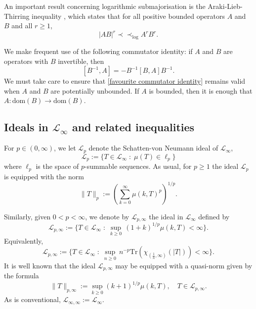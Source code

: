     An important result concerning logarithmic submajorisation is the Araki-Lieb-Thirring inequality \cite[Theorem 2]{Kosaki-alt-1992}, which states that
    for all positive bounded operators $A$ and $B$ and all $r \geq 1$,
    \begin{equation}\label{ALT inequality}
        |AB|^r \prec\prec_{\log} A^rB^r.
    \end{equation}
    
    We make frequent use of the following commutator identity: if $A$ and $B$ are operators with $B$ invertible, then
    \begin{equation}\label{favourite commutator identity}
        [B^{-1},A] = -B^{-1}[B,A]B^{-1}.
    \end{equation}
    We must take care to ensure that \eqref{favourite commutator identity} remains valid when $A$ and $B$ are potentially unbounded. If $A$ is bounded, then it is enough
    that $A:\mathrm{dom}(B)\to \mathrm{dom}(B)$.

\subsection{Ideals in $\mathcal{L}_{\infty}$ and related inequalities}
    For $p \in (0,\infty)$, we let $\mathcal{L}_{p}$ denote the Schatten-von Neumann ideal of $\mathcal{L}_{\infty}$,
    \begin{equation*}
        \mathcal{L}_p := \{T \in \mathcal{L}_{\infty}\;:\; \mu(T) \in \ell_p\}
    \end{equation*}
    where $\ell_p$ is the space of $p$-summable sequences. As usual, for $p \geq 1$ the ideal $\mathcal{L}_{p}$ is equipped
    with the norm
    \begin{equation*}
        \|T\|_{p} := \left(\sum_{k=0}^\infty \mu(k,T)^p\right)^{1/p}.
    \end{equation*}
    
    Similarly, given $0 < p < \infty$, we denote by $\mathcal{L}_{p,\infty}$ the ideal in $\mathcal{L}_{\infty}$ defined by
    \begin{equation*}
        \mathcal{L}_{p,\infty} := \{T \in \mathcal{L}_{\infty}\;:\; \sup_{k\geq 0}\, (1+k)^{1/p}\mu(k,T) < \infty\}.
    \end{equation*}
    Equivalently, 
    \begin{equation*}
        \mathcal{L}_{p,\infty} := \{T \in \mathcal{L}_{\infty}\;:\; \sup_{n\geq 0}\, n^{-p}\mathrm{Tr}(\chi_{(\frac{1}{n},\infty)}(|T|)) < \infty\}.
    \end{equation*}
    It is well known that the ideal $\mathcal{L}_{p,\infty}$ may be equipped with a quasi-norm given by the formula
    \begin{equation*}
        \|T\|_{p,\infty} := \sup_{k\geq 0} (k+1)^{1/p}\mu(k,T), \quad T \in \mathcal{L}_{p,\infty}.
    \end{equation*}
    As is conventional, $\mathcal{L}_{\infty,\infty} := \mathcal{L}_{\infty}$. 
    

